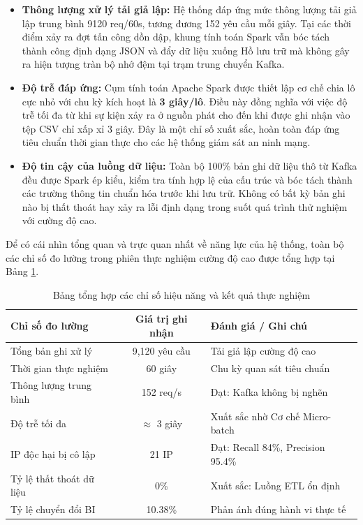 \documentclass[12pt,a4paper]{report}
\begin{document}
\begin{itemize}
    \item \textbf{Thông lượng xử lý tải giả lập:} Hệ thống đáp ứng mức thông lượng tải giả lập trung bình 9120 req/60s, tương đương 152 yêu cầu mỗi giây. Tại các thời điểm xảy ra đợt tấn công dồn dập, khung tính toán Spark vẫn bóc tách thành công định dạng JSON và đẩy dữ liệu xuống Hồ lưu trữ mà không gây ra hiện tượng tràn bộ nhớ đệm tại trạm trung chuyển Kafka.
    
    \item \textbf{Độ trễ đáp ứng:} Cụm tính toán Apache Spark được thiết lập cơ chế chia lô cực nhỏ với chu kỳ kích hoạt là \textbf{3 giây/lô}. Điều này đồng nghĩa với việc độ trễ tối đa từ khi sự kiện xảy ra ở nguồn phát cho đến khi được ghi nhận vào tệp CSV chỉ xấp xỉ 3 giây. Đây là một chỉ số xuất sắc, hoàn toàn đáp ứng tiêu chuẩn thời gian thực cho các hệ thống giám sát an ninh mạng.
    
    \item \textbf{Độ tin cậy của luồng dữ liệu:} Toàn bộ 100\% bản ghi dữ liệu thô từ Kafka đều được Spark ép kiểu, kiểm tra tính hợp lệ của cấu trúc và bóc tách thành các trường thông tin chuẩn hóa trước khi lưu trữ. Không có bất kỳ bản ghi nào bị thất thoát hay xảy ra lỗi định dạng trong suốt quá trình thử nghiệm với cường độ cao.
\end{itemize}

Để có cái nhìn tổng quan và trực quan nhất về năng lực của hệ thống, toàn bộ các chỉ số đo lường trong phiên thực nghiệm cường độ cao được tổng hợp tại Bảng \ref{tab:metrics_summary}.

\begin{table}[htbp]
    \centering
    \renewcommand{\arraystretch}{1.3}
    \begin{tabular}{|l|c|l|}
        \hline
        \textbf{Chỉ số đo lường} & \textbf{Giá trị ghi nhận} & \textbf{Đánh giá / Ghi chú} \\
        \hline
        Tổng bản ghi xử lý & 9,120 yêu cầu & Tải giả lập cường độ cao \\
        \hline
        Thời gian thực nghiệm & 60 giây & Chu kỳ quan sát tiêu chuẩn \\
        \hline
        Thông lượng trung bình & 152 req/s & Đạt: Kafka không bị nghẽn \\
        \hline
        Độ trễ tối đa & $\approx$ 3 giây & Xuất sắc nhờ Cơ chế Micro-batch \\
        \hline
        IP độc hại bị cô lập & 21 IP & Đạt: Recall 84\%, Precision 95.4\% \\
        \hline
        Tỷ lệ thất thoát dữ liệu & 0\% & Xuất sắc: Luồng ETL ổn định \\
        \hline
        Tỷ lệ chuyển đổi BI & 10.38\% & Phản ánh đúng hành vi thực tế \\
        \hline
    \end{tabular}
    \caption{Bảng tổng hợp các chỉ số hiệu năng và kết quả thực nghiệm}
    \label{tab:metrics_summary}
\end{table}
\end{document}
